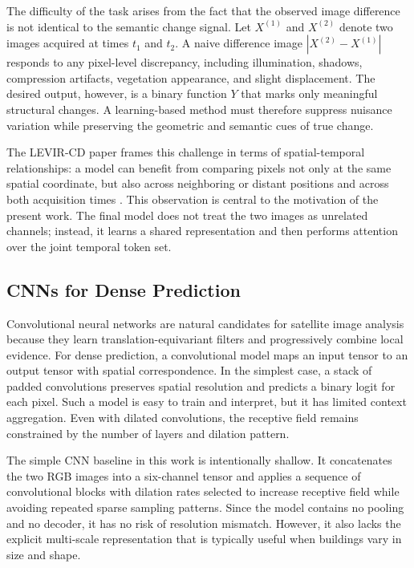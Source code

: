 \documentclass[11pt,a4paper]{article}
\begin{document}
The difficulty of the task arises from the fact that the observed image difference is not identical to the semantic change signal. Let \(X^{(1)}\) and \(X^{(2)}\) denote two images acquired at times \(t_1\) and \(t_2\). A naive difference image \(|X^{(2)} - X^{(1)}|\) responds to any pixel-level discrepancy, including illumination, shadows, compression artifacts, vegetation appearance, and slight displacement. The desired output, however, is a binary function \(Y\) that marks only meaningful structural changes. A learning-based method must therefore suppress nuisance variation while preserving the geometric and semantic cues of true change.

The LEVIR-CD paper frames this challenge in terms of spatial-temporal relationships: a model can benefit from comparing pixels not only at the same spatial coordinate, but also across neighboring or distant positions and across both acquisition times \cite{chen2020levir}. This observation is central to the motivation of the present work. The final model does not treat the two images as unrelated channels; instead, it learns a shared representation and then performs attention over the joint temporal token set.

\subsection{CNNs for Dense Prediction}

Convolutional neural networks are natural candidates for satellite image analysis because they learn translation-equivariant filters and progressively combine local evidence. For dense prediction, a convolutional model maps an input tensor to an output tensor with spatial correspondence. In the simplest case, a stack of padded convolutions preserves spatial resolution and predicts a binary logit for each pixel. Such a model is easy to train and interpret, but it has limited context aggregation. Even with dilated convolutions, the receptive field remains constrained by the number of layers and dilation pattern.

The simple CNN baseline in this work is intentionally shallow. It concatenates the two RGB images into a six-channel tensor and applies a sequence of convolutional blocks with dilation rates selected to increase receptive field while avoiding repeated sparse sampling patterns. Since the model contains no pooling and no decoder, it has no risk of resolution mismatch. However, it also lacks the explicit multi-scale representation that is typically useful when buildings vary in size and shape.
\end{document}

